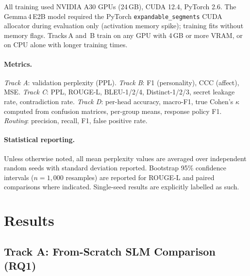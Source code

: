 \documentclass[11pt]{article}
\begin{document}
All training used NVIDIA A30 GPUs (24\,GB), CUDA 12.4, PyTorch 2.6.
The Gemma\,4\,E2B model required the PyTorch \texttt{expandable\_segments} CUDA allocator during evaluation only (activation memory spike); training fits without memory flags.
Tracks\,A and~B train on any GPU with 4\,GB or more VRAM, or on CPU alone with longer training times.

\paragraph{Metrics.}
\textit{Track A}: validation perplexity (PPL).
\textit{Track B}: F1 (personality), CCC (affect), MSE.
\textit{Track C}: PPL, ROUGE-L, BLEU-1/2/4, Distinct-1/2/3, secret leakage rate, contradiction rate.
\textit{Track D}: per-head accuracy, macro-F1, true Cohen's $\kappa$ computed from confusion matrices, per-group means, response policy F1.
\textit{Routing}: precision, recall, F1, false positive rate.

\paragraph{Statistical reporting.} Unless otherwise noted, all mean perplexity values are averaged over independent random seeds with standard deviation reported.
Bootstrap 95\% confidence intervals ($n{=}1{,}000$ resamples) are reported for ROUGE-L and paired comparisons where indicated.
Single-seed results are explicitly labelled as such.

\section{Results}
\label{sec:results}

\subsection{Track A: From-Scratch SLM Comparison (RQ1)}
\end{document}
